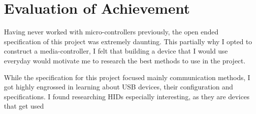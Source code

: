 \documentclass{article}
\begin{document}
	\section{Evaluation of Achievement}
		Having never worked with micro-controllers previously, the open ended specification of this project was extremely daunting. This partially why I opted to construct a media-controller, I felt that building a device that I would use everyday would motivate me to research the best methods to use in the project. 
		
		While the specification for this project focused mainly communication methods, I got highly engrossed in learning about USB devices, their configuration and specifications. I found researching HIDs especially interesting, as they are devices that get used 
				
	
	
	
			
	\newpage	
		
			
	
	
	

	\newpage
\end{document}
